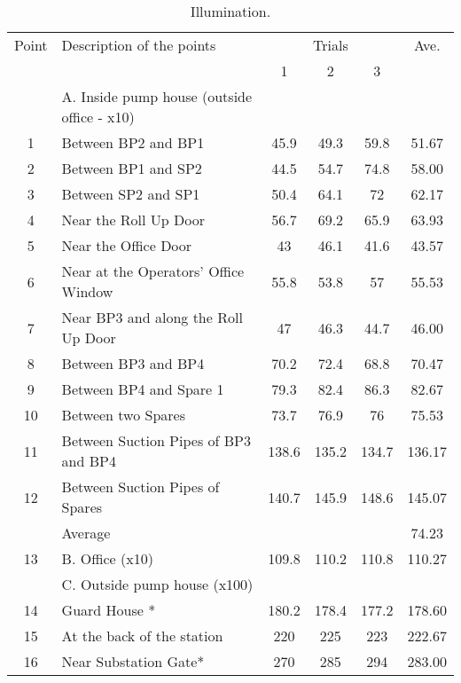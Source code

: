 \begin{table}[h]
    \caption{Illumination.}
    \label{ch04_tbl_wem04}
    \footnotesize{


\begin{tabular}{c|l|c|c|c|c}
\hline
Point & Description of the points & \multicolumn{3}{c|}{Trials} & Ave. \\ 
\cline{3-5}
 &  & 1 & 2 & 3 &  \\ 
\hline
 & A. Inside pump house (outside office - x10) &  &  &  &  \\ 
1 & Between BP2 and BP1 & 45.9 & 49.3 & 59.8 & 51.67 \\ 
2 & Between BP1 and SP2 & 44.5 & 54.7 & 74.8 & 58.00 \\ 
3 & Between SP2 and SP1 & 50.4 & 64.1 & 72 & 62.17 \\ 
4 & Near the Roll Up Door & 56.7 & 69.2 & 65.9 & 63.93 \\ 
5 & Near the Office Door & 43 & 46.1 & 41.6 & 43.57 \\ 
6 & Near at the Operators’ Office Window & 55.8 & 53.8 & 57 & 55.53 \\ 
7 & Near BP3 and along the Roll Up Door & 47 & 46.3 & 44.7 & 46.00 \\ 
8 & Between BP3 and BP4 & 70.2 & 72.4 & 68.8 & 70.47 \\ 
9 & Between BP4 and Spare 1 & 79.3 & 82.4 & 86.3 & 82.67 \\ 
10 & Between two Spares & 73.7 & 76.9 & 76 & 75.53 \\ 
11 & Between Suction Pipes of BP3 and BP4 & 138.6 & 135.2 & 134.7 & 136.17 \\ 
12 & Between Suction Pipes of Spares & 140.7 & 145.9 & 148.6 & 145.07 \\ 
 & Average &  &  &  & 74.23 \\ 
\hline
13 & B. Office (x10) & 109.8 & 110.2 & 110.8 & 110.27 \\ 
\hline
 & C. Outside pump house (x100) &  &  &  &  \\ 
14 & Guard House * & 180.2 & 178.4 & 177.2 & 178.60 \\ 
15 & At the back of the station & 220 & 225 & 223 & 222.67 \\ 
16 & Near Substation Gate* & 270 & 285 & 294 & 283.00 \\ 
\hline
\end{tabular}
}
\end{table}

